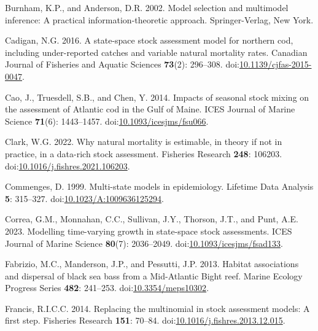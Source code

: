 \documentclass[
]{article}
\newlength{\cslhangindent}
\newlength{\cslentryspacingunit} %
\newenvironment{CSLReferences}[2] %
 {%
  \setlength{\parindent}{0pt}
  \ifodd #1
  \let\oldpar\par
  \def\par{\hangindent=\cslhangindent\oldpar}
  \fi
  \setlength{\parskip}{#2\cslentryspacingunit}
 }%
 {}
\begin{document}
\begin{CSLReferences}{1}{0}
\leavevmode{}%
Burnham, K.P., and Anderson, D.R. 2002. Model selection and multimodel
inference: A practical information-theoretic approach. Springer-Verlag,
New York.

\leavevmode{}%
Cadigan, N.G. 2016. A state-space stock assessment model for northern
cod, including under-reported catches and variable natural mortality
rates. Canadian Journal of Fisheries and Aquatic Sciences
\textbf{73}(2): 296--308.
doi:\href{https://doi.org/10.1139/cjfas-2015-0047}{10.1139/cjfas-2015-0047}.

\leavevmode{}%
Cao, J., Truesdell, S.B., and Chen, Y. 2014. Impacts of seasonal stock
mixing on the assessment of {A}tlantic cod in the {G}ulf of {M}aine.
ICES Journal of Marine Science \textbf{71}(6): 1443--1457.
doi:\href{https://doi.org/10.1093/icesjms/fsu066}{10.1093/icesjms/fsu066}.

\leavevmode{}%
Clark, W.G. 2022. Why natural mortality is estimable, in theory if not
in practice, in a data-rich stock assessment. Fisheries Research
\textbf{248}: 106203.
doi:\href{https://doi.org/10.1016/j.fishres.2021.106203}{10.1016/j.fishres.2021.106203}.

\leavevmode{}%
Commenges, D. 1999. Multi-state models in epidemiology. Lifetime Data
Analysis \textbf{5}: 315--327.
doi:\href{https://doi.org/10.1023/A:1009636125294}{10.1023/A:1009636125294}.

\leavevmode{}%
Correa, G.M., Monnahan, C.C., Sullivan, J.Y., Thorson, J.T., and Punt,
A.E. 2023. Modelling time-varying growth in state-space stock
assessments. ICES Journal of Marine Science \textbf{80}(7): 2036--2049.
doi:\href{https://doi.org/10.1093/icesjms/fsad133}{10.1093/icesjms/fsad133}.

\leavevmode{}%
Fabrizio, M.C., Manderson, J.P., and Pessutti, J.P. 2013. Habitat
associations and dispersal of black sea bass from a {M}id-{A}tlantic
{B}ight reef. Marine Ecology Progress Series \textbf{482}: 241--253.
doi:\href{https://doi.org/10.3354/meps10302}{10.3354/meps10302}.

\leavevmode{}%
Francis, R.I.C.C. 2014. Replacing the multinomial in stock assessment
models: A first step. Fisheries Research \textbf{151}: 70--84.
doi:\href{https://doi.org/10.1016/j.fishres.2013.12.015}{10.1016/j.fishres.2013.12.015}.


\end{CSLReferences}
\end{document}
